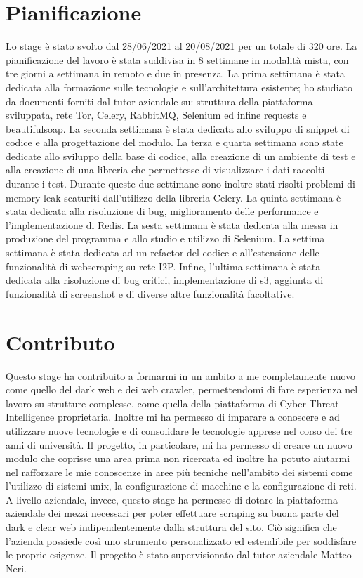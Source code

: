 \section{Pianificazione}
Lo stage è stato svolto dal 28/06/2021 al 20/08/2021 per un totale di 320 ore. La pianificazione del lavoro è stata suddivisa in 8 settimane in modalità mista, con tre giorni a settimana in remoto e due in presenza. La prima settimana è stata dedicata alla formazione sulle tecnologie e sull'architettura esistente; ho studiato da documenti forniti dal tutor aziendale su: struttura della piattaforma sviluppata, rete Tor, Celery, RabbitMQ, Selenium ed infine requests e beautifulsoap.\newline{}
La seconda settimana è stata dedicata allo sviluppo di snippet di codice e alla progettazione del modulo. \newline{}
La terza e quarta settimana sono state dedicate allo sviluppo della base di codice, alla creazione di un ambiente di test e alla creazione di una libreria che permettesse di visualizzare i dati raccolti durante i test. Durante queste due settimane sono inoltre stati risolti problemi di memory leak scaturiti dall'utilizzo della libreria Celery.
La quinta settimana è stata dedicata alla risoluzione di bug, miglioramento delle performance e l'implementazione di Redis.
La sesta settimana è stata dedicata alla messa in produzione del programma e allo studio e utilizzo di Selenium.
La settima settimana è stata dedicata ad un refactor del codice e all'estensione delle funzionalità di webscraping su rete I2P.
Infine, l'ultima settimana è stata dedicata alla risoluzione di bug critici, implementazione di s3, aggiunta di funzionalità di screenshot e di diverse altre funzionalità facoltative.


\section{Contributo}
Questo stage ha contribuito a formarmi in un ambito a me completamente nuovo come quello del dark web e dei web crawler, permettendomi di fare esperienza nel lavoro su strutture complesse, come quella della piattaforma di Cyber Threat Intelligence proprietaria. Inoltre mi ha permesso di imparare a conoscere e ad utilizzare nuove tecnologie e di consolidare le tecnologie apprese nel corso dei tre anni di università. Il progetto, in particolare, mi ha permesso di creare un nuovo modulo che coprisse una area prima non ricercata ed inoltre ha potuto aiutarmi nel rafforzare le mie conoscenze in aree più tecniche nell'ambito dei sistemi come l'utilizzo di sistemi unix, la configurazione di macchine e la configurazione di reti. A livello aziendale, invece, questo stage ha permesso di dotare la piattaforma aziendale dei mezzi necessari per poter effettuare scraping su buona parte del dark e clear web indipendentemente dalla struttura del sito. Ciò significa che l’azienda possiede così uno strumento personalizzato ed estendibile per soddisfare le proprie esigenze. \newline{}
Il progetto è stato supervisionato dal tutor aziendale Matteo Neri.

